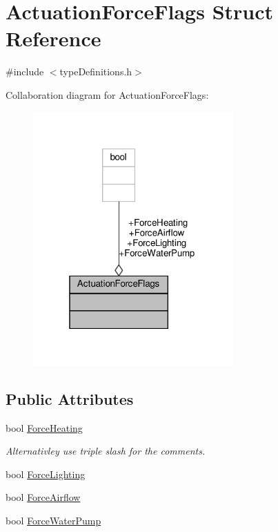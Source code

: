 \hypertarget{structActuationForceFlags}{}\section{Actuation\+Force\+Flags Struct Reference}
\label{structActuationForceFlags}


{\ttfamily \#include $<$type\+Definitions.\+h$>$}



Collaboration diagram for Actuation\+Force\+Flags\+:\nopagebreak
\begin{figure}[H]
\begin{center}
\leavevmode
\includegraphics[width=217pt]{structActuationForceFlags__coll__graph}
\end{center}
\end{figure}
\subsection*{Public Attributes}
\begin{DoxyCompactItemize}
\item 
bool \hyperlink{structActuationForceFlags_acfa5f3a1459c151992a2d783b79ea734}{Force\+Heating}
\begin{DoxyCompactList}\small\item\em Alternativley use triple slash for the comments. \end{DoxyCompactList}\item 
bool \hyperlink{structActuationForceFlags_a575df93310a4363147c99437d7b8061c}{Force\+Lighting}
\item 
bool \hyperlink{structActuationForceFlags_a6df34a4a82cc2b7297f8a1cbe2e073da}{Force\+Airflow}
\item 
bool \hyperlink{structActuationForceFlags_ab969137846bc6b38bbe3c204e8a4975e}{Force\+Water\+Pump}
\end{DoxyCompactItemize}


